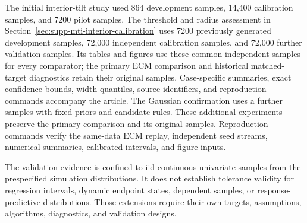 \documentclass[11pt]{article}
\newcounter{algorithm}
\begin{document}
The initial interior-tilt study used 864 development samples, 14,400
calibration samples, and 7200 pilot samples. The threshold and
radius assessment in Section~\ref{sec:supp-mti-interior-calibration}
uses 7200 previously generated development samples, 72,000 independent
calibration samples, and 72,000 further validation samples.
Its tables and figures use these common independent samples for every comparator;
the primary ECM comparison and historical matched-target diagnostics retain
their original samples. Case-specific summaries, exact confidence bounds,
width quantiles, source identifiers, and reproduction commands accompany
the article. The Gaussian confirmation uses a further
\MTIBoundaryConfirmationSamples{} samples with fixed priors and candidate
rules. These additional experiments preserve the primary comparison and
its original samples. Reproduction commands verify the same-data ECM
replay, independent seed streams, numerical summaries, calibrated
intervals, and figure inputs.

The validation evidence is confined to iid continuous univariate samples from
the prespecified simulation distributions. It does not establish tolerance
validity for regression intervals, dynamic endpoint states, dependent samples,
or response-predictive distributions. Those extensions require their own
targets, assumptions, algorithms, diagnostics, and validation designs.



\end{document}
